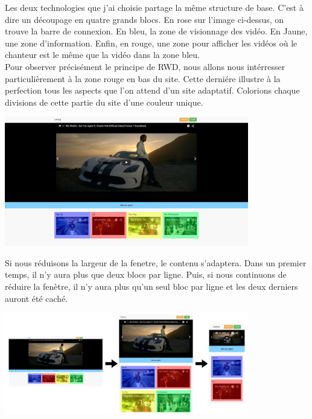\documentclass{article}
\begin{document}
Les deux technologies que j'ai choisie partage la m\^eme structure de base. C'est \`a dire un d\'ecoupage en quatre grands blocs. En rose sur l'image ci-dessus, on trouve la barre de connexion. En bleu, la zone de visionnage des vid\'eo. En Jaune, une zone d'information. Enfin, en rouge, une zone pour afficher les vid\'eos o\`u le chanteur est le m\^eme que la vid\'eo dans la zone bleu.\\
Pour observer pr\'ecis\'ement le principe de RWD, nous allons nous int\'erresser particuli\`erement \`a la zone rouge en bas du site. Cette derni\'ere illustre \`a la perfection tous les aspects que l'on attend d'un site adaptatif. Colorions chaque divisions de cette partie du site d'une couleur unique.
\begin{center}
\vspace{0.5cm}
\includegraphics[width=0.8\textwidth]{pc4}
\vspace{0.5cm}
\end{center}
Si nous r\'eduisons la largeur de la fenetre, le contenu s'adaptera. Dans un premier temps, il n'y aura plus que deux blocs par ligne. Puis, si nous continuons de r\'eduire la fen\`etre, il n'y aura plus qu'un seul bloc par ligne et les deux derniers auront \'et\'e cach\'e.
\begin{center}
\vspace{0.5cm}
\includegraphics[width=0.8\textwidth]{pc7}
\vspace{0.5cm}\\
\end{center}
\end{document}
